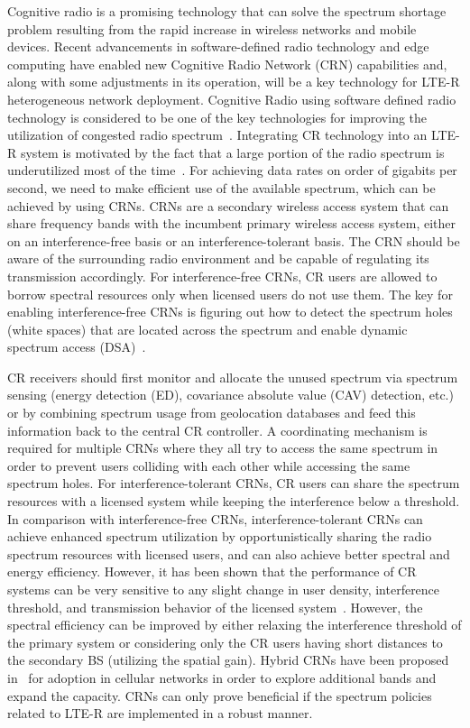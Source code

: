 Cognitive radio is a promising technology that can solve the spectrum shortage problem resulting from the rapid increase in wireless networks and mobile devices. Recent advancements in software-defined radio technology and edge computing have enabled new Cognitive Radio Network (CRN)  capabilities and, along with some adjustments in its operation, will be a key technology for LTE-R heterogeneous network deployment. Cognitive Radio using software defined radio technology is considered to be one of the key technologies for improving the utilization of congested radio spectrum~\cite{rusek2013scaling}. Integrating CR technology into an LTE-R system is motivated by the fact that a large portion of the radio spectrum is underutilized most of the time~\cite{7553613}. For achieving data rates on order of gigabits per second, we need to make efficient use of the available spectrum, which can be achieved by using CRNs. CRNs are a secondary wireless access system that can share frequency bands with the incumbent primary wireless access system, either on an interference-free basis or an interference-tolerant basis. The CRN should be aware of
the surrounding radio environment and be capable of regulating its transmission accordingly. For interference-free CRNs, CR users are allowed to borrow spectral resources only when licensed users do not use them. The key for enabling interference-free CRNs is figuring out how to detect the spectrum holes (white spaces) that are located across the spectrum and enable dynamic spectrum access (DSA)~\cite{wyglinski2009cognitive}.

CR receivers should first monitor and allocate the unused spectrum via spectrum sensing (energy detection (ED), covariance absolute value (CAV) detection, etc.)~\cite{wyglinski2009cognitive} or by combining spectrum usage from geolocation databases and feed this information back to the central CR controller. A coordinating mechanism is required for multiple CRNs where they all try to access the same spectrum in order to prevent users colliding with each other while accessing the same spectrum holes. For interference-tolerant CRNs, CR users can share the spectrum resources with a licensed system while keeping the interference below a threshold. In comparison with interference-free CRNs, interference-tolerant CRNs can achieve enhanced spectrum utilization by opportunistically sharing the radio spectrum resources with licensed users, and can also achieve better spectral and energy efficiency. However, it has been shown that the performance of CR systems can be very sensitive to any slight change in user density, interference threshold, and transmission behavior of the licensed system~\cite{haykin2005cognitive}. However, the spectral efficiency can be improved by either relaxing the interference threshold of the primary system or considering only the CR users having short distances to the secondary BS (utilizing the spatial gain). Hybrid CRNs have been proposed in~\cite{hong2010capacity} for adoption in cellular networks in order to explore additional bands and expand the capacity. CRNs can only prove beneficial if the spectrum policies related to LTE-R are implemented in a robust manner. 

